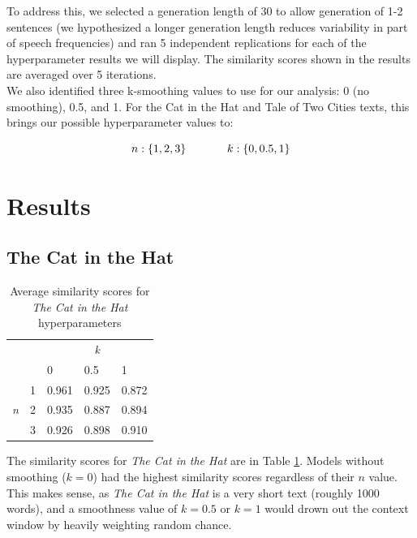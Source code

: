 \documentclass[11pt]{article}
\begin{document}
To address this, we selected a generation length of 30 to allow generation of 1-2 sentences (we hypothesized a longer generation length reduces variability in part of speech frequencies) and ran 5 independent replications for each of the hyperparameter results we will display.  The similarity scores shown in the results are averaged over 5 iterations.\\

We also identified three k-smoothing values to use for our analysis: 0 (no smoothing), 0.5, and 1.  For the Cat in the Hat and Tale of Two Cities texts, this brings our possible hyperparameter values to:

$$n: \{1, 2, 3\} \hspace{0.5in} k: \{0, 0.5, 1\}$$

\section{Results}
\label{sec:results}

\subsection{The Cat in the Hat}

\begin{table}[!ht]
\centering
\begin{tabular}{lllll}
                            &                        & \multicolumn{3}{c}{\textit{k}} \\
                            &                        & 0          & 0.5          & 1         \\ \cline{3-5} 
\multirow{3}{*}{\textit{n}} & \multicolumn{1}{l|}{1} & 0.961          & 0.925            & 0.872         \\
                            & \multicolumn{1}{l|}{2} & 0.935          & 0.887            & 0.894         \\
                            & \multicolumn{1}{l|}{3} & 0.926          & 0.898            & 0.910        
\end{tabular}
\caption{Average similarity scores for \textit{The Cat in the Hat} hyperparameters}
\label{tab:cat}
\end{table}

The similarity scores for \textit{The Cat in the Hat} are in Table \ref{tab:cat}.  Models without smoothing ($k = 0$) had the highest similarity scores regardless of their $n$ value.  This makes sense, as \textit{The Cat in the Hat} is a very short text (roughly 1000 words), and a smoothness value of $k = 0.5$ or $k=1$ would drown out the context window by heavily weighting random chance.\\
\end{document}
